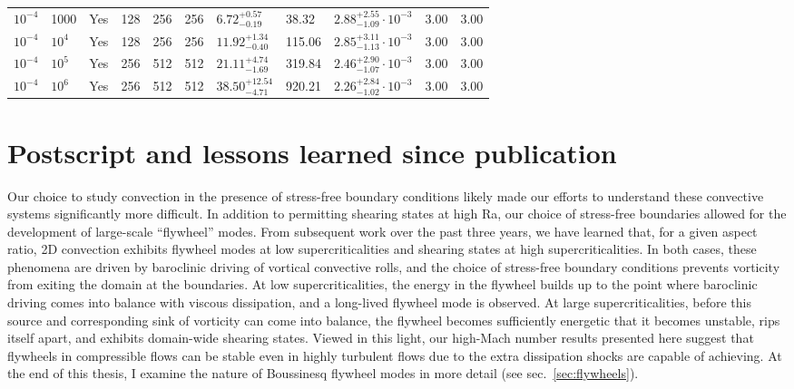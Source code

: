 \begin{table}
\begin{center}
{\begin{tabular}{ p{1cm} p{1cm} p{1cm} p{1cm} p{1cm} p{1cm} p{1.75cm} p{1.5cm} p{2.75cm} p{1cm} p{1.2cm}  }
\vspace{0.08cm}$10^{-4}$	&	1000	&	Yes	&	128	&	256	&	256	&$	6.72	_{-	0.19	}^{+	0.57	}$&	38.32	&$	2.88	_{-	1.09	}^{+	2.55}\cdot 10^{-3}	$&	3.00	&	3.00	\\
\vspace{0.08cm}$10^{-4}$	&	$10^4$	&	Yes	&	128	&	256	&	256	&$	11.92	_{-	0.40	}^{+	1.34	}$&	115.06	&$	2.85	_{-	1.13	}^{+	3.11}\cdot 10^{-3}	$&	3.00	&	3.00	\\
\vspace{0.08cm}$10^{-4}$	&	$10^5$	&	Yes	&	256	&	512	&	512	&$	21.11	_{-	1.69	}^{+	4.74	}$&	319.84	&$	2.46	_{-	1.07	}^{+	2.90}\cdot 10^{-3}	$&	3.00	&	3.00	\\
\vspace{0.08cm}$10^{-4}$	&	$10^6$	&	Yes	&	256	&	512	&	512	&$	38.50	_{-	4.71	}^{+	12.54	}$&	920.21	&$	2.26	_{-	1.02	}^{+	2.84}\cdot 10^{-3}	$&	3.00	&	3.00	\\
\hline
\end{tabular}
}
\end{center}
\end{table}

\newpage
\section{Postscript and lessons learned since publication}
\label{sec:ab17_postscript}

Our choice to study convection in the presence of stress-free boundary conditions likely made our efforts to understand these convective systems significantly more difficult.
In addition to permitting shearing states \citep[as in e.g.,][]{goluskin&all2014} at high Ra, our choice of stress-free boundaries allowed for the development of large-scale ``flywheel'' modes.
From subsequent work over the past three years, we have learned that, for a given aspect ratio, 2D convection exhibits flywheel modes at low supercriticalities and shearing states at high supercriticalities.
In both cases, these phenomena are driven by baroclinic driving of vortical convective rolls, and the choice of stress-free boundary conditions prevents vorticity from exiting the domain at the boundaries.
At low supercriticalities, the energy in the flywheel builds up to the point where baroclinic driving comes into balance with viscous dissipation, and a long-lived flywheel mode is observed.
At large supercriticalities, before this source and corresponding sink of vorticity can come into balance, the flywheel becomes sufficiently energetic that it becomes unstable, rips itself apart, and exhibits domain-wide shearing states.
Viewed in this light, our high-Mach number results presented here suggest that flywheels in compressible flows can be stable even in highly turbulent flows due to the extra dissipation shocks are capable of achieving.
At the end of this thesis, I examine the nature of Boussinesq flywheel modes in more detail (see sec.~\ref{sec:flywheels}).

